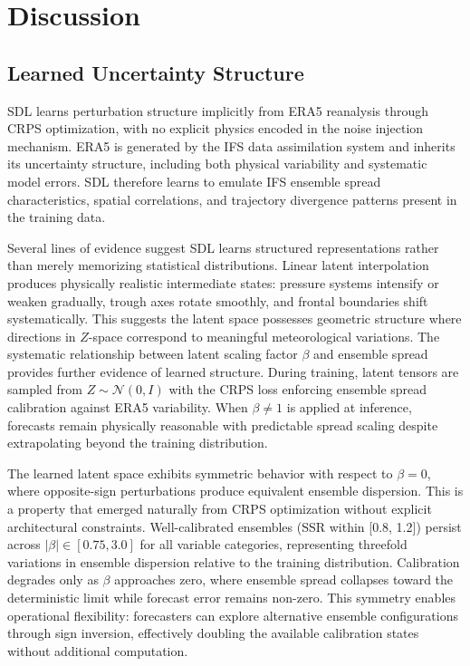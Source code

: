 \documentclass{agujournal2019}
\begin{document}
\section{Discussion}

\subsection{Learned Uncertainty Structure}

SDL learns perturbation structure implicitly from ERA5 reanalysis through CRPS optimization, with no explicit physics encoded in the noise injection mechanism. ERA5 is generated by the IFS data assimilation system and inherits its uncertainty structure, including both physical variability and systematic model errors. SDL therefore learns to emulate IFS ensemble spread characteristics, spatial correlations, and trajectory divergence patterns present in the training data.

Several lines of evidence suggest SDL learns structured representations rather than merely memorizing statistical distributions. Linear latent interpolation produces physically realistic intermediate states: pressure systems intensify or weaken gradually, trough axes rotate smoothly, and frontal boundaries shift systematically. This suggests the latent space possesses geometric structure where directions in $Z$-space correspond to meaningful meteorological variations. The systematic relationship between latent scaling factor $\beta$ and ensemble spread provides further evidence of learned structure. During training, latent tensors are sampled from $Z \sim \mathcal{N}(0, I)$ with the CRPS loss enforcing ensemble spread calibration against ERA5 variability. When $\beta \neq 1$ is applied at inference, forecasts remain physically reasonable with predictable spread scaling despite extrapolating beyond the training distribution.

The learned latent space exhibits symmetric behavior with respect to $\beta = 0$, where opposite-sign perturbations produce equivalent ensemble dispersion. This is a property that emerged naturally from CRPS optimization without explicit architectural constraints. Well-calibrated ensembles (SSR within [0.8, 1.2]) persist across $|\beta| \in [0.75, 3.0]$ for all variable categories, representing threefold variations in ensemble dispersion relative to the training distribution. Calibration degrades only as $\beta$ approaches zero, where ensemble spread collapses toward the deterministic limit while forecast error remains non-zero. This symmetry enables operational flexibility: forecasters can explore alternative ensemble configurations through sign inversion, effectively doubling the available calibration states without additional computation.
\end{document}
